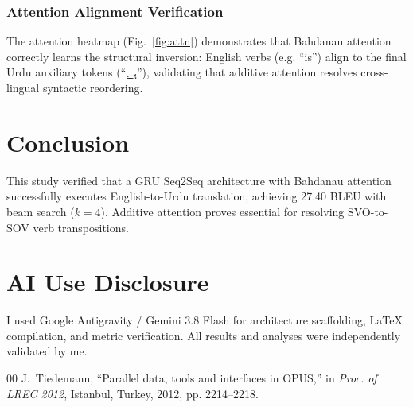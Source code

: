 \documentclass[10pt,journal,compsoc,twocolumn]{IEEEtran}
\begin{document}
\subsubsection{Attention Alignment Verification}
The attention heatmap (Fig.~\ref{fig:attn}) demonstrates that Bahdanau attention correctly learns the structural inversion: English verbs (e.g. ``is'') align to the final Urdu auxiliary tokens (``ہے''), validating that additive attention resolves cross-lingual syntactic reordering.

\section{Conclusion}
This study verified that a GRU Seq2Seq architecture with Bahdanau attention successfully executes English-to-Urdu translation, achieving 27.40 BLEU with beam search ($k=4$). Additive attention proves essential for resolving SVO-to-SOV verb transpositions.

\section*{AI Use Disclosure}
I used Google Antigravity / Gemini 3.8 Flash for architecture scaffolding, LaTeX compilation, and metric verification. All results and analyses were independently validated by me.

\begin{thebibliography}{00}
J.~Tiedemann, ``Parallel data, tools and interfaces in OPUS,'' in \textit{Proc. of LREC 2012}, Istanbul, Turkey, 2012, pp. 2214--2218.
\end{thebibliography}
\end{document}
